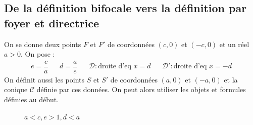 \subsection{De la définition bifocale vers la définition par foyer et directrice}
On se donne deux points $F$ et $F'$ de coordonnées $(c,0)$ et $(-c,0)$ et un réel $a>0$. On pose :
\begin{align*}
 e=\dfrac{c}{a} & & d=\dfrac{a}{e} & & \mathcal D : \text{droite d'eq }x=d & & \mathcal D' : \text{droite d'eq }x=-d
\end{align*}
On définit aussi les points $S$ et $S'$ de coordonnées $(a,0)$ et $(-a,0)$ et la conique $\mathcal C$ définie par ces données. On peut alors utiliser les objets et formules définies au début. 
\begin{figure}[ht]
  \hfill
  \begin{minipage}{.45\linewidth}
    
    \caption{$a>c , e<1 , d>a$}
    \label{fig:C4893_7}
  \end{minipage}
  \hfill
  \begin{minipage}{.45\linewidth}
    
    \caption{$a<c , e>1 , d<a$}
    \label{fig:C4893_8}
  \end{minipage}
  \hfill
\end{figure}
